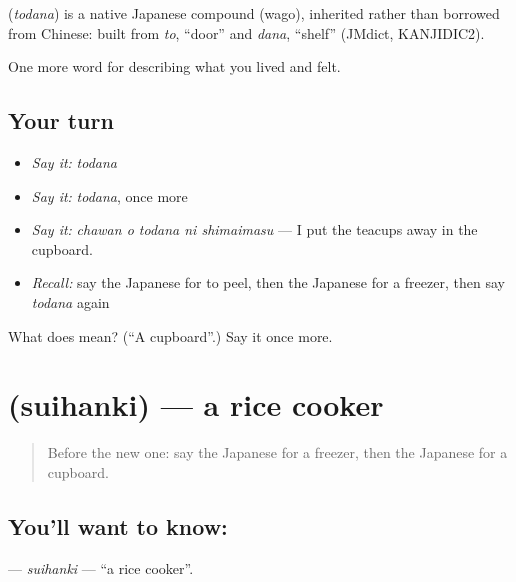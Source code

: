 \begin{cousinweb}
\textbf{} (\emph{todana}) is a native Japanese compound (wago), inherited rather than borrowed from Chinese: built from \emph{to}, \textquotedblleft{}door\textquotedblright{} and \emph{dana}, \textquotedblleft{}shelf\textquotedblright{} (JMdict, KANJIDIC2).
\end{cousinweb}

\begin{grammarlens}[title={What you've built}]
One more word for describing what you lived and felt.
\end{grammarlens}

\subsection*{Your turn}
\begin{itemize}
\raggedright
  \item \emph{Say it:} \emph{todana}
  \item \emph{Say it:} \emph{todana}, once more
  \item \emph{Say it:} \emph{chawan o todana ni shimaimasu} — I put the teacups away in the cupboard.
  \item \emph{Recall:} say the Japanese for to peel, then the Japanese for a freezer, then say \emph{todana} again
\end{itemize}

\begin{tcolorbox}[breakable,colback=teal!4,colframe=teal!35!black,title={Before you move on}]
What does  mean? (\textquotedblleft{}A cupboard\textquotedblright{}.) Say it once more.
\end{tcolorbox}
\section[\texorpdfstring{\ja{すいはんき} (suihanki)}{すいはんき (suihanki)}]{ (suihanki) — a rice cooker}

\label{lesson:JA-C493-suihanki}



\begin{quote}
Before the new one: say the Japanese for a freezer, then the Japanese for a cupboard.
\end{quote}

\subsection*{You'll want to know: }
\textbf{} — \emph{suihanki} — \textquotedblleft{}a rice cooker\textquotedblright{}.

